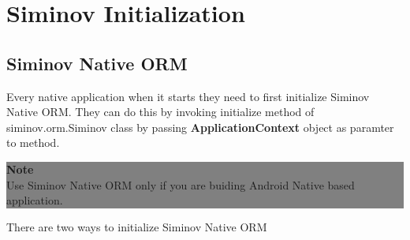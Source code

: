 \newpage
\chapter {\Large{Siminov Initialization}}

\section{Siminov Native ORM}
Every native application when it starts they need to first initialize Siminov Native ORM. They can do this by invoking initialize method of siminov.orm.Siminov class by passing \textbf{ApplicationContext} object as paramter to method.

		\begin{center}
			\colorbox{grey}{
				\parbox[t]{.8\linewidth}{
					\fontsize{11pt}{11pt}\selectfont %
					\vspace*{0.1cm} %
		
					\hfill \textbf{Note} \\

					Use Siminov Native ORM only if you are buiding Android Native based application. 

					\vspace*{0.0cm} %
				}
			}

		\end{center}



\par
There are two ways to initialize Siminov Native ORM

